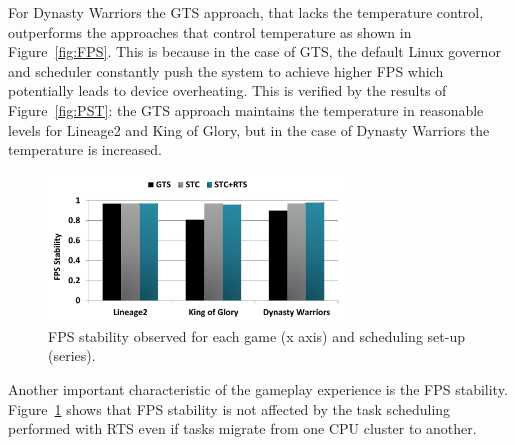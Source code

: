 For Dynasty Warriors the GTS approach, that lacks the temperature control, outperforms the approaches that control temperature as shown in Figure~\ref{fig:FPS}. 
This is because in the case of GTS, the default Linux governor and scheduler constantly push the system to achieve higher FPS which potentially leads to device overheating. 
This is verified by the results of Figure~\ref{fig:PST}: the GTS approach maintains the temperature in reasonable levels for Lineage2 and King of Glory, but in the case of Dynasty Warriors the temperature is increased.

\begin{figure}[t]%
	\centering
	\includegraphics[width=0.7\textwidth]{figures/stability.pdf}
	\caption{FPS stability observed for each game (x axis) and scheduling set-up (series).}
	\label{fig:stability}
\end{figure}

Another important characteristic of the gameplay experience is the FPS stability.
Figure~\ref{fig:stability} shows that FPS stability is not affected by the task scheduling performed with RTS even if tasks migrate from one CPU cluster to another.

